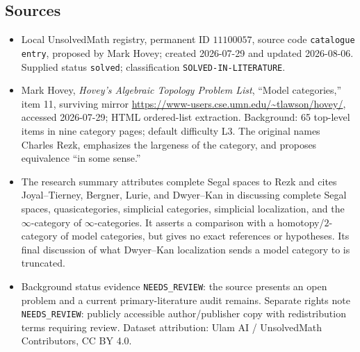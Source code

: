 \documentclass[11pt]{article}
\begin{document}
\subsection{Sources}
\begin{itemize}
\item Local UnsolvedMath registry, permanent ID $11100057$, source code \texttt{catalogue entry}, proposed by Mark Hovey; created 2026-07-29 and updated 2026-08-06. Supplied status \texttt{solved}; classification \texttt{SOLVED-IN-LITERATURE}.
\item Mark Hovey, \emph{Hovey's Algebraic Topology Problem List}, ``Model categories,'' item 11, surviving mirror \url{https://www-users.cse.umn.edu/~tlawson/hovey/}, accessed 2026-07-29; HTML ordered-list extraction. Background: 65 top-level items in nine category pages; default difficulty L3. The original names Charles Rezk, emphasizes the largeness of the category, and proposes equivalence ``in some sense.''
\item The research summary attributes complete Segal spaces to Rezk and cites Joyal--Tierney, Bergner, Lurie, and Dwyer--Kan in discussing complete Segal spaces, quasicategories, simplicial categories, simplicial localization, and the $\infty$-category of $\infty$-categories. It asserts a comparison with a homotopy/$2$-category of model categories, but gives no exact references or hypotheses. Its final discussion of what Dwyer--Kan localization sends a model category to is truncated.
\item Background status evidence \texttt{NEEDS\_REVIEW}: the source presents an open problem and a current primary-literature audit remains. Separate rights note \texttt{NEEDS\_REVIEW}: publicly accessible author/publisher copy with redistribution terms requiring review. Dataset attribution: Ulam AI / UnsolvedMath Contributors, CC BY 4.0.
\end{itemize}
\end{document}
